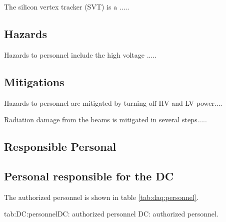 {The silicon vertex tracker (SVT) is a .....

\subsection{Hazards} 
\indent

Hazards to personnel include the high voltage .....

\subsection{Mitigations}
\indent

Hazards to personnel are mitigated by turning off HV and LV power....

Radiation damage from the beams is mitigated in several steps.....

\subsection{Responsible Personal}


\infolevltone{\newpage}
\begin{safetyen}{10}{15}
\section{ Personal responsible for the DC} 
\end{safetyen}
The authorized personnel is shown in table \ref{tab:daq:personnel}.
\begin{namestab}{tab:DC:personnel}{DC: authorized personnel}{%
      DC: authorized personnel.}
\end{namestab}

}
